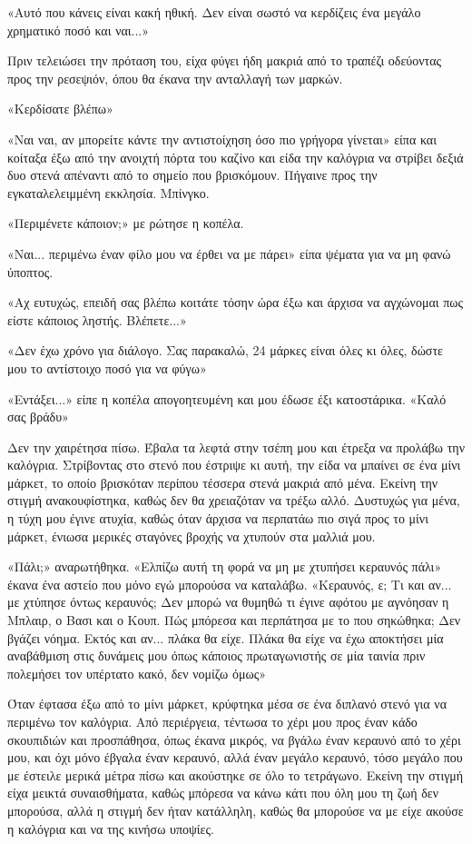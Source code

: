 \documentclass[12pt,twoside, openany]{book}
\begin{document}
«Αυτό που κάνεις είναι κακή ηθική. Δεν είναι σωστό να κερδίζεις ένα μεγάλο χρηματικό ποσό και ναι...»

Πριν τελειώσει την πρόταση του, είχα φύγει ήδη μακριά από το τραπέζι οδεύοντας προς την ρεσεψιόν, όπου θα έκανα την ανταλλαγή των μαρκών.

«Κερδίσατε βλέπω»

«Ναι ναι, αν μπορείτε κάντε την αντιστοίχηση όσο πιο γρήγορα γίνεται» είπα και κοίταξα έξω από την ανοιχτή πόρτα του καζίνο και είδα την καλόγρια να στρίβει δεξιά δυο στενά απέναντι από το σημείο που βρισκόμουν. Πήγαινε προς την εγκαταλελειμμένη εκκλησία. Μπίνγκο.

«Περιμένετε κάποιον;» με ρώτησε η κοπέλα.

«Ναι... περιμένω έναν φίλο μου να έρθει να με πάρει» είπα ψέματα για να μη φανώ ύποπτος.

«Αχ ευτυχώς, επειδή σας βλέπω κοιτάτε τόσην ώρα έξω και άρχισα να αγχώνομαι πως είστε κάποιος ληστής. Βλέπετε...»

«Δεν έχω χρόνο για διάλογο. Σας παρακαλώ, 24 μάρκες είναι όλες κι όλες, δώστε μου το αντίστοιχο ποσό για να φύγω»

«Εντάξει...» είπε η κοπέλα απογοητευμένη και μου έδωσε έξι κατοστάρικα. «Καλό σας βράδυ»

Δεν την χαιρέτησα πίσω. Έβαλα τα λεφτά στην τσέπη μου και έτρεξα να προλάβω την καλόγρια. Στρίβοντας στο στενό που έστριψε κι αυτή, την είδα να μπαίνει σε ένα μίνι μάρκετ, το οποίο βρισκόταν περίπου τέσσερα στενά μακριά από μένα. Εκείνη την στιγμή ανακουφίστηκα, καθώς δεν θα χρειαζόταν να τρέξω αλλό. Δυστυχώς για μένα, η τύχη μου έγινε ατυχία, καθώς όταν άρχισα να περπατάω πιο σιγά προς το μίνι μάρκετ, ένιωσα μερικές σταγόνες βροχής να χτυπούν στα μαλλιά μου.

«Πάλι;» αναρωτήθηκα. «Ελπίζω αυτή τη φορά να μη με χτυπήσει κεραυνός πάλι» έκανα ένα αστείο που μόνο εγώ μπορούσα να καταλάβω. «Κεραυνός, ε; Τι και αν... με χτύπησε όντως κεραυνός; Δεν μπορώ να θυμηθώ τι έγινε αφότου με αγνόησαν η Μπλαιρ, ο Βασι και ο Κουπ. Πώς μπόρεσα και περπάτησα με το που σηκώθηκα; Δεν βγάζει νόημα. Εκτός και αν... πλάκα θα είχε. Πλάκα θα είχε να έχω αποκτήσει μία αναβάθμιση στις δυνάμεις μου όπως κάποιος πρωταγωνιστής σε μία ταινία πριν πολεμήσει τον υπέρτατο κακό, δεν νομίζω όμως»

Όταν έφτασα έξω από το μίνι μάρκετ, κρύφτηκα μέσα σε ένα διπλανό στενό για να περιμένω τον καλόγρια. Από περιέργεια, τέντωσα το χέρι μου προς έναν κάδο σκουπιδιών και προσπάθησα, όπως έκανα μικρός, να βγάλω έναν κεραυνό από το χέρι μου, και όχι μόνο έβγαλα έναν κεραυνό, αλλά έναν μεγάλο κεραυνό, τόσο μεγάλο που με έστειλε μερικά μέτρα πίσω και ακούστηκε σε όλο το τετράγωνο. Εκείνη την στιγμή είχα μεικτά συναισθήματα, καθώς μπόρεσα να κάνω κάτι που όλη μου τη ζωή δεν μπορούσα, αλλά η στιγμή δεν ήταν κατάλληλη, καθώς θα μπορούσε να με είχε ακούσε η καλόγρια και να της κινήσω υποψίες.
\end{document}
